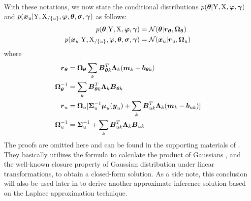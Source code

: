 With these notations, we now state the conditional distributions $p(\boldsymbol{\theta}\vert\mathrm{Y},\mathrm{X},\boldsymbol{\varphi},\boldsymbol{\gamma})$ and $p(\boldsymbol{x}_{u}\vert\mathrm{Y},\mathrm{X}_{/\{u\}},\boldsymbol{\varphi},\boldsymbol{\theta},\boldsymbol{\sigma},\boldsymbol{\gamma})$ as follows:
\begin{align}
    p(\boldsymbol{\theta}\vert\mathrm{Y},\mathrm{X},\boldsymbol{\varphi},\boldsymbol{\gamma})
    & = \mathcal{N}(\boldsymbol{\theta}\vert\boldsymbol{r}_{\boldsymbol{\theta}}, \boldsymbol{\Omega}_{\boldsymbol{\theta}})    
    \label{eq-vgmgp-theta-conditional}
    \\
    p(\boldsymbol{x}_{u}\vert\mathrm{Y},\mathrm{X}_{/\{u\}},\boldsymbol{\varphi},\boldsymbol{\theta},\boldsymbol{\sigma},\boldsymbol{\gamma})
    & = \mathcal{N}(\boldsymbol{x}_{u}\vert\boldsymbol{r}_{u}, \boldsymbol{\Omega}_{u})
    \label{eq-vgmgp-xu-conditional}
\end{align}
where 
\begin{align}
    \boldsymbol{r}_{\boldsymbol{\theta}} 
    & = \boldsymbol{\Omega}_{\boldsymbol{\theta}} \sum_k{\boldsymbol{B}_{\boldsymbol{\theta}{k}}^T\boldsymbol{\Lambda}_{k}(\boldsymbol{m}_{k} - \boldsymbol{b}_{\boldsymbol{\theta}{k}})}    
    \label{eq-vgmgp-theta-conditional-mean}
    \\
    \boldsymbol{\Omega}_{\boldsymbol{\theta}}^{-1}
    & = \sum_k{\boldsymbol{B}_{\boldsymbol{\theta}{k}}^T\boldsymbol{\Lambda}_{k}\boldsymbol{B}_{\boldsymbol{\theta}{k}}}
    \label{eq-vgmgp-theta-conditional-covariance}
    \\
    \boldsymbol{r}_{u}
    & = \boldsymbol{\Omega}_{u}[
        \boldsymbol{\Sigma}_{u}^{-1}\boldsymbol{\mu}_{u}(\boldsymbol{y}_{u})
        + \sum_k{
            \boldsymbol{B}_{u{k}}^T\boldsymbol{\Lambda}_{k}(\boldsymbol{m}_{k} - \boldsymbol{b}_{u{k}})}        
    ]
    \label{eq-vgmgp-xu-conditional-mean}
    \\
    \boldsymbol{\Omega}_{u}^{-1}
    & = \boldsymbol{\Sigma}_{u}^{-1} + \sum_k{
        \boldsymbol{B}_{u{k}}^T\boldsymbol{\Lambda}_{k}\boldsymbol{B}_{u{k}} 
    } 
    \label{eq-vgmgp-xu-conditional-covariance}
\end{align}
The proofs are omitted here and can be found in the supporting materials of \cite{gorbach2017scalable}.
They basically utilizes the formula to calculate the product of Gaussians \citep[]{petersen2012matrix}, and the well-known closure property of Gaussian distribution under linear transformations, to obtain a closed-form solution.
As a side note, this conclusion will also be used later in  to derive another approximate inference solution based on the Laplace approximation technique.

